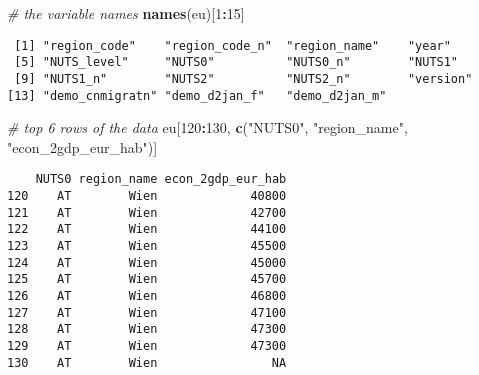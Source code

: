 \documentclass[]{article}
\newenvironment{Shaded}{\begin{snugshade}}{\end{snugshade}}
\newcommand{\CommentTok}[1]{\textcolor[rgb]{0.56,0.35,0.01}{\textit{#1}}}
\newcommand{\DecValTok}[1]{\textcolor[rgb]{0.00,0.00,0.81}{#1}}
\newcommand{\KeywordTok}[1]{\textcolor[rgb]{0.13,0.29,0.53}{\textbf{#1}}}
\newcommand{\NormalTok}[1]{#1}
\newcommand{\OperatorTok}[1]{\textcolor[rgb]{0.81,0.36,0.00}{\textbf{#1}}}
\newcommand{\StringTok}[1]{\textcolor[rgb]{0.31,0.60,0.02}{#1}}
\begin{document}
\begin{Shaded}
\begin{Highlighting}[]
\CommentTok{# the variable names}
\KeywordTok{names}\NormalTok{(eu)[}\DecValTok{1}\OperatorTok{:}\DecValTok{15}\NormalTok{]}
\end{Highlighting}
\end{Shaded}

\begin{verbatim}
 [1] "region_code"    "region_code_n"  "region_name"    "year"          
 [5] "NUTS_level"     "NUTS0"          "NUTS0_n"        "NUTS1"         
 [9] "NUTS1_n"        "NUTS2"          "NUTS2_n"        "version"       
[13] "demo_cnmigratn" "demo_d2jan_f"   "demo_d2jan_m"  
\end{verbatim}

\begin{Shaded}
\begin{Highlighting}[]
\CommentTok{# top 6 rows of the data}
\NormalTok{eu[}\DecValTok{120}\OperatorTok{:}\DecValTok{130}\NormalTok{, }\KeywordTok{c}\NormalTok{(}\StringTok{"NUTS0"}\NormalTok{, }\StringTok{"region_name"}\NormalTok{, }\StringTok{"econ_2gdp_eur_hab"}\NormalTok{)]}
\end{Highlighting}
\end{Shaded}

\begin{verbatim}
    NUTS0 region_name econ_2gdp_eur_hab
120    AT        Wien             40800
121    AT        Wien             42700
122    AT        Wien             44100
123    AT        Wien             45500
124    AT        Wien             45000
125    AT        Wien             45700
126    AT        Wien             46800
127    AT        Wien             47100
128    AT        Wien             47300
129    AT        Wien             47300
130    AT        Wien                NA
\end{verbatim}

\begin{Shaded}
\end{Shaded}
\end{document}
